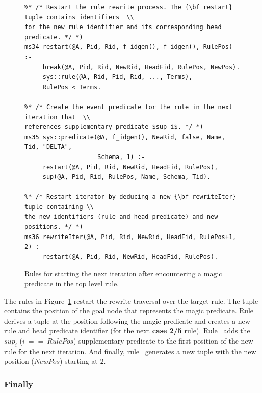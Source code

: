 \begin{figure}[!t]
\ssp
\centering
\begin{lstlisting}
%* /* Restart the rule rewrite process. The {\bf restart} tuple contains identifiers  \\
for the new rule identifier and its corresponding head predicate. */ *)
ms34 restart(@A, Pid, Rid, f_idgen(), f_idgen(), RulePos) :-
     break(@A, Pid, Rid, NewRid, HeadFid, RulePos, NewPos).
     sys::rule(@A, Rid, Pid, Rid, ..., Terms),
     RulePos < Terms.
	
%* /* Create the event predicate for the rule in the next iteration that  \\
references supplementary predicate $sup_i$. */ *)
ms35 sys::predicate(@A, f_idgen(), NewRid, false, Name, Tid, "DELTA", 
                    Schema, 1) :-
     restart(@A, Pid, Rid, NewRid, HeadFid, RulePos),
     sup(@A, Pid, Rid, RulePos, Name, Schema, Tid).
	
%* /* Restart iterator by deducing a new {\bf rewriteIter} tuple containing \\
the new identifiers (rule and head predicate) and new positions. */ *)
ms36 rewriteIter(@A, Pid, Rid, NewRid, HeadFid, RulePos+1, 2) :-
     restart(@A, Pid, Rid, NewRid, HeadFid, RulePos).
\end{lstlisting}
\caption{\label{ch:magic:fig:rewrite8}Rules for starting the next iteration after
encountering a magic predicate in the top level rule. }
\end{figure}

The rules in Figure~\ref{ch:magic:fig:rewrite8} restart the rewrite traversal
over the target rule.  The  tuple contains the position of the goal
node that represents the magic predicate.  Rule~ derives a
 tuple at the position following the magic predicate and creates a
new rule and head predicate identifier (for the next {\bf case 2/5} rule).
Rule~ adds the $sup_i$ ($i\ ==\ RulePos$) supplementary predicate to
the first position of the new rule for the next iteration.  And finally,
rule~ generates a new  tuple with the new position
($NewPos$) starting at $2$.

\subsubsection{Finally}

